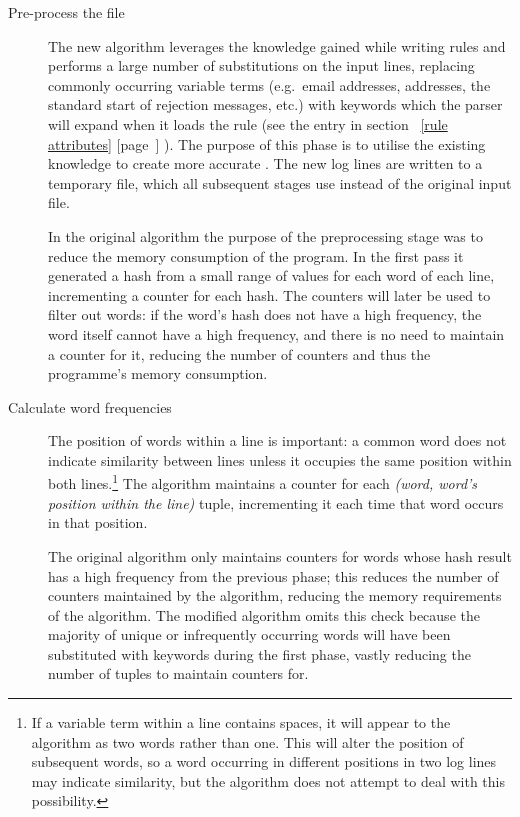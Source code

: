 \documentclass[a4paper,12pt,draft]{article}
\newcommand{\refwithpage}[1]{%
    \empty{}\ref{#1} [page~\pageref{#1}]%
}
\begin{document}
\begin{description}

    \item [Pre-process the file]  The new algorithm leverages the knowledge
        gained while writing rules and performs a large number of
        substitutions on the input lines, replacing commonly occurring
        variable terms (e.g.\ email addresses, \IP{} addresses, the
        standard start of rejection messages, etc.) with \regex{} keywords
        which the parser will expand when it loads the rule (see the
        \regex{} entry in section~\refwithpage{rule attributes}).  The
        purpose of this phase is to utilise the existing knowledge to
        create more accurate \regexes{}.  The new log lines are written to
        a temporary file, which all subsequent stages use instead of the
        original input file.

        In the original algorithm the purpose of the preprocessing stage
        was to reduce the memory consumption of the program.  In the first
        pass it generated a hash from a small range of values for each word
        of each line, incrementing a counter for each hash.  The counters
        will later be used to filter out words: if the word's hash does not
        have a high frequency, the word itself cannot have a high
        frequency, and there is no need to maintain a counter for it,
        reducing the number of counters and thus the programme's memory
        consumption.

    \item [Calculate word frequencies]  The position of words within a line
        is important: a common word does not indicate similarity between
        lines unless it occupies the same position within both
        lines.\footnote{If a variable term within a line contains spaces,
        it will appear to the algorithm as two words rather than one.  This
        will alter the position of subsequent words, so a word occurring in
        different positions in two log lines may indicate similarity, but
        the algorithm does not attempt to deal with this possibility.}  The
        algorithm maintains a counter for each \textit{(word, word's
        position within the line)\/} tuple, incrementing it each time that
        word occurs in that position.

        The original algorithm only maintains counters for words whose hash
        result has a high frequency from the previous phase; this reduces
        the number of counters maintained by the algorithm, reducing the
        memory requirements of the algorithm.  The modified algorithm omits
        this check because the majority of unique or infrequently occurring
        words will have been substituted with keywords during the first
        phase, vastly reducing the number of tuples to maintain counters
        for.


\end{description}
\end{document}
